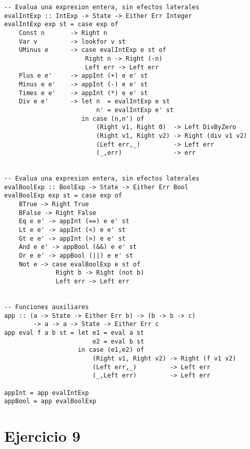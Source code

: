 \documentclass[12pt,a4paper]{article}
\begin{document}
\begin{verbatim}
-- Evalua una expresion entera, sin efectos laterales
evalIntExp :: IntExp -> State -> Either Err Integer
evalIntExp exp st = case exp of
    Const n       -> Right n
    Var v         -> lookfor v st
    UMinus e      -> case evalIntExp e st of
                      Right n -> Right (-n)
                      Left err -> Left err
    Plus e e'     -> appInt (+) e e' st
    Minus e e'    -> appInt (-) e e' st
    Times e e'    -> appInt (*) e e' st
    Div e e'      -> let n  = evalIntExp e st
                         n' = evalIntExp e' st
                     in case (n,n') of
                         (Right v1, Right 0)  -> Left DivByZero
                         (Right v1, Right v2) -> Right (div v1 v2)
                         (Left err,_)         -> Left err
                         (_,err)              -> err


-- Evalua una expresion entera, sin efectos laterales
evalBoolExp :: BoolExp -> State -> Either Err Bool
evalBoolExp exp st = case exp of
    BTrue -> Right True
    BFalse -> Right False
    Eq e e' -> appInt (==) e e' st 
    Lt e e' -> appInt (<) e e' st 
    Gt e e' -> appInt (>) e e' st 
    And e e' -> appBool (&&) e e' st
    Or e e' -> appBool (||) e e' st
    Not e -> case evalBoolExp e st of
              Right b -> Right (not b)
              Left err -> Left err


-- Funciones auxiliares
app :: (a -> State -> Either Err b) -> (b -> b -> c)
        -> a -> a -> State -> Either Err c
app eval f a b st = let e1 = eval a st
                        e2 = eval b st
                    in case (e1,e2) of
                        (Right v1, Right v2) -> Right (f v1 v2)
                        (Left err,_)         -> Left err
                        (_,Left err)         -> Left err

appInt = app evalIntExp
appBool = app evalBoolExp

\end{verbatim}

\section{Ejercicio 9}
\end{document}
